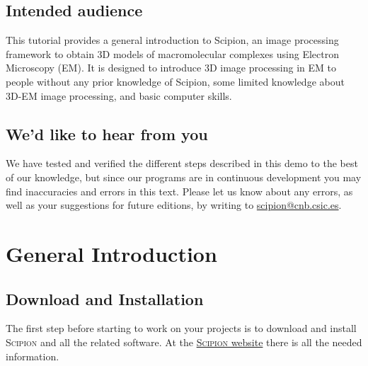 \documentclass[12pt]{article} %
\newcommand{\scipion}{\textsc{Scipion} }
\begin{document}


\subsection*{Intended audience}

This tutorial provides a general introduction to Scipion, an image
processing framework to obtain 3D models of macromolecular complexes
using Electron Microscopy (EM). It is designed to introduce 3D image
processing in EM to people without any prior knowledge of Scipion,
some limited knowledge about 3D-EM image processing, and basic
computer skills.

\subsection*{We'd like to hear from you}

We have tested and verified the different steps described in this demo
to the best of our knowledge, but since our programs are in continuous
development you may find inaccuracies and errors in this text. Please
let us know about any errors, as well as your suggestions for
future editions, by writing to
\href{mailto:scipion@cnb.csic.es}{scipion@cnb.csic.es}.

\newpage



\tableofcontents %

\newpage %


\section{General Introduction}

\subsection{Download and Installation}

The first step before starting to work on your projects is to download
and install \scipion and all the related software. At the
\href{http://scipionwiki.cnb.csic.es}{\scipion website} there is all
the needed information.
\end{document}
